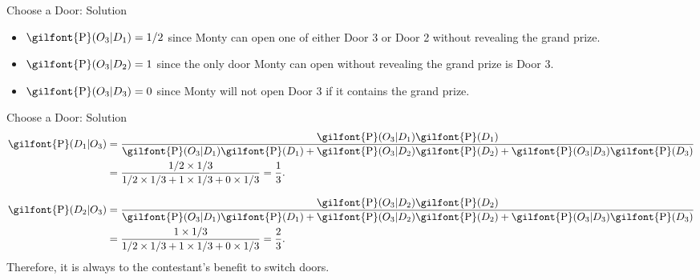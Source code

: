 \documentclass[
  ignorenonframetext,
]{beamer}
\begin{document}
\begin{frame}{Choose a Door: Solution}
\protect\hypertarget{choose-a-door-solution-1}{}
\begin{itemize}
\item $\textrm{\gilfont{P}}\normalfont (O_3|D_1)=1/2$ since Monty can open one of either Door 3 or Door 2 without revealing the grand prize.
\item $\textrm{\gilfont{P}}\normalfont (O_3|D_2)=1$ since the only door Monty can open without revealing the grand prize is Door 3.
\item $\textrm{\gilfont{P}}\normalfont (O_3|D_3)=0$ since Monty will not open Door 3 if it contains the grand prize.
\end{itemize}
\end{frame}

\begin{frame}{Choose a Door: Solution}
\protect\hypertarget{choose-a-door-solution-2}{}
\begin{equation*}
\begin{split}
\textrm{\gilfont{P}}\normalfont (D_1|O_3)&=\dfrac{\textrm{\gilfont{P}}\normalfont (O_3|D_1)\textrm{\gilfont{P}}\normalfont (D_1)}{\textrm{\gilfont{P}}\normalfont (O_3|D_1)\textrm{\gilfont{P}}\normalfont (D_1)+\textrm{\gilfont{P}}\normalfont (O_3|D_2)\textrm{\gilfont{P}}\normalfont (D_2)+\textrm{\gilfont{P}}\normalfont (O_3|D_3)\textrm{\gilfont{P}}\normalfont (D_3)}\\
&=\dfrac{1/2 \times 1/3}{1/2 \times 1/3 + 1 \times 1/3 + 0 \times
1/3}=\dfrac{1}{3}.
\end{split}
\end{equation*}

\begin{equation*}
\begin{split}
\textrm{\gilfont{P}}\normalfont (D_2|O_3)&=\dfrac{\textrm{\gilfont{P}}\normalfont (O_3|D_2)\textrm{\gilfont{P}}\normalfont (D_2)}{\textrm{\gilfont{P}}\normalfont (O_3|D_1)\textrm{\gilfont{P}}\normalfont (D_1)+\textrm{\gilfont{P}}\normalfont (O_3|D_2)\textrm{\gilfont{P}}\normalfont (D_2)+\textrm{\gilfont{P}}\normalfont (O_3|D_3)\textrm{\gilfont{P}}\normalfont (D_3)}\\
&=\dfrac{1 \times 1/3}{1/2 \times 1/3 + 1 \times 1/3 + 0 \times
1/3}=\dfrac{2}{3}.
\end{split}
\end{equation*} Therefore, it is always to the contestant's benefit to
switch doors.
\end{frame}
\end{document}
